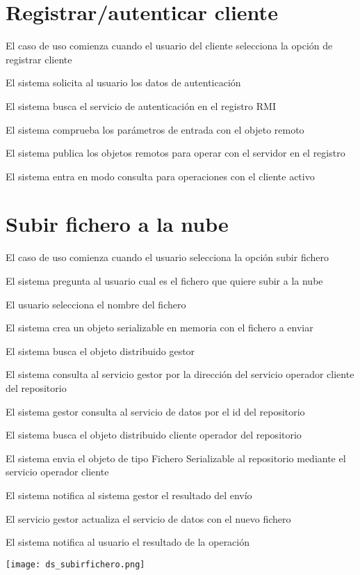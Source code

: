 \section{Registrar/autenticar cliente}

\begin{compactenum}
	\item El caso de uso comienza cuando el usuario del cliente selecciona la opción de registrar cliente
	\item El sistema solicita al usuario los datos de autenticación
	\item El sistema busca el servicio de autenticación en el registro RMI
	\item El sistema comprueba los parámetros de entrada con el objeto remoto
	\item El sistema publica los objetos remotos para operar con el servidor en el registro
	\item El sistema entra en modo consulta para operaciones con el cliente activo
\end{compactenum}

\section{Subir fichero a la nube}
\begin{compactenum}
	\item El caso de uso comienza cuando el usuario selecciona la opción subir fichero
	\item El sistema pregunta al usuario cual es el fichero que quiere subir a la nube
	\item El usuario selecciona el nombre del fichero
	\item El sistema crea un objeto serializable en memoria con el fichero a enviar
	\item El sistema busca el objeto distribuido gestor
	\item El sistema consulta al servicio gestor por la dirección del servicio operador cliente del repositorio
	\item El sistema gestor consulta al servicio de datos por el id del repositorio
	\item El sistema busca el objeto distribuido cliente operador del repositorio
	\item El sistema envia el objeto de tipo Fichero Serializable al repositorio mediante el servicio operador cliente
	\item El sistema notifica al sistema gestor el resultado del envío
	\item El servicio gestor actualiza el servicio de datos con el nuevo fichero
	\item El sistema notifica al usuario el resultado de la operación
\end{compactenum}
\texttt{[image: ds\_subirfichero.png]}

